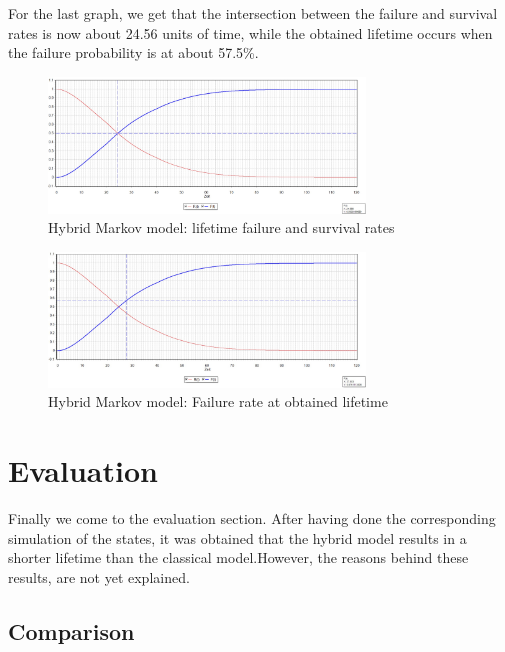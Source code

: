 \documentclass{article}
\begin{document}
\begin{doublespacing}
\par For the last graph, we get that the intersection between the failure and survival rates is now about 24.56 units of time, while the obtained lifetime occurs when the failure probability is at about 57.5\%. 

\begin{figure}[H] 
    \centering
    \includegraphics[width=0.75\textwidth]{Images/FSHIn.JPG} 
    \caption{Hybrid Markov model: lifetime failure and survival rates} 
    \label{fig:FSHIn} 
\end{figure}

\begin{figure}[H] 
    \centering
    \includegraphics[width=0.75\textwidth]{Images/FSHLT.JPG} 
    \caption{Hybrid Markov model: Failure rate at obtained lifetime} 
    \label{fig:FSHLT} 
\end{figure}






\newpage

\section{Evaluation}

\par Finally we come to the evaluation section. After having done the corresponding simulation of the states, it was obtained that the hybrid model results in a shorter lifetime than the classical model.However, the reasons behind these results, are not yet explained.

\subsection{Comparison}


\end{doublespacing}
\end{document}
